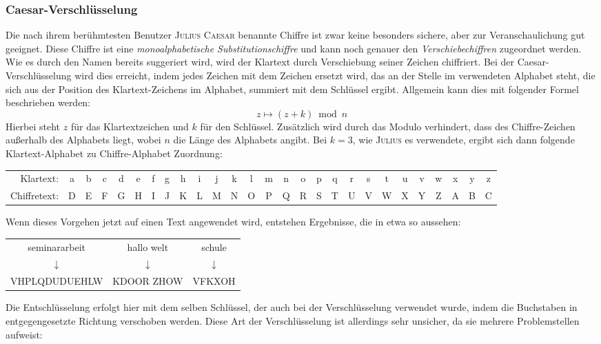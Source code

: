 \documentclass{scrarticle} %
\newcommand{\person}[1]{\textsc{#1}}
\begin{document}
    \subsubsection{Caesar-Verschlüsselung}
    Die nach ihrem berühmtesten Benutzer \person{Julius Caesar} benannte Chiffre ist zwar keine besonders sichere, aber zur Veranschaulichung gut geeignet. Diese Chiffre ist eine \emph{monoalphabetische Substitutionschiffre} und kann noch genauer den \emph{Verschiebechiffren} zugeordnet werden. Wie es durch den Namen bereits suggeriert wird, wird der Klartext durch Verschiebung seiner Zeichen chiffriert. Bei der Caesar-Verschlüsselung wird dies erreicht, indem jedes Zeichen mit dem Zeichen ersetzt wird, das an der Stelle im verwendeten Alphabet steht, die sich aus der Position des Klartext-Zeichens im Alphabet, summiert mit dem Schlüssel ergibt. Allgemein kann dies mit folgender Formel beschrieben werden:
    \begin{equation}
        z \mapsto (z+k) \bmod n
    \end{equation}
    Hierbei steht $z$ für das Klartextzeichen und $k$ für den Schlüssel. Zusätzlich wird durch das Modulo verhindert, dass des Chiffre-Zeichen außerhalb des Alphabets liegt, wobei $n$ die Länge des Alphabets angibt. Bei $k=3$, wie \person{Julius} es verwendete, ergibt sich dann folgende Klartext-Alphabet zu Chiffre-Alphabet Zuordnung:
    \begin{center}
        \begin{tabularx}{\textwidth}{r*{26}{C}}
            Klartext: &a&b&c&d&e&f&g&h&i&j&k&l&m&n&o&p&q&r&s&t&u&v&w&x&y&z\\
            Chiffretext: &D&E&F&G&H&I&J&K&L&M&N&O&P&Q&R&S&T&U&V&W&X&Y&Z&A&B&C       
        \end{tabularx}
    \end{center}
    Wenn dieses Vorgehen jetzt auf einen Text angewendet wird, entstehen Ergebnisse, die in etwa so aussehen:
    \begin{center}
        \begin{tabular}{ccc}
            seminararbeit & hallo welt & schule \\
            $\downarrow$ & 	$\downarrow$ & 	$\downarrow$\\
            VHPLQDUDUEHLW & KDOOR ZHOW & VFKXOH
        \end{tabular}
    \end{center}
    Die Entschlüsselung erfolgt hier mit dem selben Schlüssel, der auch bei der Verschlüsselung verwendet wurde, indem die Buchstaben in entgegengesetzte Richtung verschoben werden. Diese Art der Verschlüsselung ist allerdings sehr unsicher, da sie mehrere Problemstellen aufweist:
\end{document}
